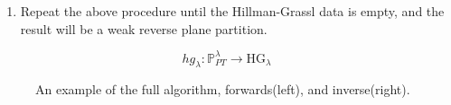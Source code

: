 \documentclass{article}
\begin{document}
\begin{enumerate}
\begin{center}
				\end{center}
		\item Repeat the above procedure until the Hillman-Grassl data is empty, and the result will be a weak reverse plane partition.
	\end{enumerate}
	
\newpage
	
\begin{figure}[h]
\caption{An example of the full algorithm, forwards(left), and inverse(right).}
\begin{multicols}{2}

$$hg_\lambda: \mathbb{P}_{PT}^\lambda \rightarrow \mbox{HG}_\lambda$$

	


\end{multicols}
\end{figure}
\end{document}
